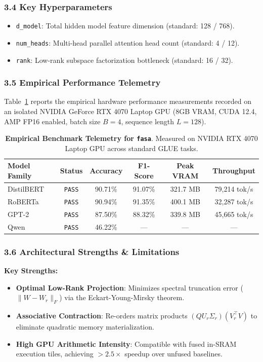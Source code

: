 \subsubsection*{3.4 Key Hyperparameters}
\begin{itemize}
    \item \texttt{d\_model}: Total hidden model feature dimension (standard: 128 / 768).
    \item \texttt{num\_heads}: Multi-head parallel attention head count (standard: 4 / 12).
    \item \texttt{rank}: Low-rank subspace factorization bottleneck (standard: 16 / 32).
\end{itemize}

\subsubsection*{3.5 Empirical Performance Telemetry}
Table~\ref{tab:telemetry_fasa} reports the empirical hardware performance measurements recorded on an isolated NVIDIA GeForce RTX 4070 Laptop GPU (8GB VRAM, CUDA 12.4, AMP FP16 enabled, batch size $B=4$, sequence length $L=128$).

\begin{table}[h]
\centering
\small
\caption{\textbf{Empirical Benchmark Telemetry for \texttt{fasa}}. Measured on NVIDIA RTX 4070 Laptop GPU across standard GLUE tasks.}
\label{tab:telemetry_fasa}
\begin{tabular*}{\columnwidth}{@{\extracolsep{\fill}}lccccc}
\toprule
\textbf{Model Family} & \textbf{Status} & \textbf{Accuracy} & \textbf{F1-Score} & \textbf{Peak VRAM} & \textbf{Throughput} \\
\midrule
DistilBERT & \texttt{PASS} & 90.71\% & 91.07\% & 321.7 MB & 79,214 tok/s \\
RoBERTa & \texttt{PASS} & 90.94\% & 91.35\% & 400.1 MB & 32,287 tok/s \\
GPT-2 & \texttt{PASS} & 87.50\% & 88.32\% & 339.8 MB & 45,665 tok/s \\
Qwen & \texttt{PASS} & 46.22\% & --- & --- & --- \\
\bottomrule
\end{tabular*}
\end{table}

\subsubsection*{3.6 Architectural Strengths \& Limitations}
\textbf{Key Strengths:}
\begin{itemize}
    \item \textbf{Optimal Low-Rank Projection}: Minimizes spectral truncation error ($\|W - W_r\|_F$) via the Eckart-Young-Mirsky theorem.
    \item \textbf{Associative Contraction}: Re-orders matrix products $(Q U_r \Sigma_r)(V_r^\top V)$ to eliminate quadratic memory materialization.
    \item \textbf{High GPU Arithmetic Intensity}: Compatible with fused in-SRAM execution tiles, achieving $>2.5\times$ speedup over unfused baselines.
\end{itemize}

